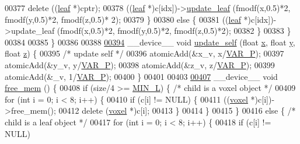 \begin{DoxyCode}
{00377                     \textcolor{keyword}{delete} ((\hyperlink{classleaf}{leaf} *)cptr);
00378                 ((\hyperlink{classleaf}{leaf} *)c[idx])->\hyperlink{classleaf_a3c205ce57e242832977bde6e1a04d7da}{update\_leaf} (fmodf(x,0.5)*2, fmodf(y,0.5)*2, fmodf(z,0.5)*
      2);
00379             \}
00380             \textcolor{keywordflow}{else} \{
00381                 ((\hyperlink{classleaf}{leaf} *)c[idx])->update\_leaf (fmodf(x,0.5)*2, fmodf(y,0.5)*2, fmodf(z,0.5)*2);
00382             \}
00383         \}
00384 
00385     \}
00386 
00388 
\hypertarget{Voxel_8cuh_source.tex_l00394}{}\hyperlink{classvoxel_a1748472909af5ef1f28d0a0c6648dbbd}{00394}     \_\_device\_\_ \textcolor{keywordtype}{void} \hyperlink{classvoxel_a1748472909af5ef1f28d0a0c6648dbbd}{update\_self} (\textcolor{keywordtype}{float} \hyperlink{classquaternion_acdcda48f9dd7ff35873aae38fa33ab78}{x}, \textcolor{keywordtype}{float} \hyperlink{classquaternion_a48e3d1fbf5e12eb54985c32b45dd8303}{y}, \textcolor{keywordtype}{float} \hyperlink{classquaternion_a538598007238d399f79ddcecd39ef5cf}{z}) \{
00395         \textcolor{comment}{/* update self */}
00396         atomicAdd(&x\_v, x/\hyperlink{Voxel_8cuh_ae1cd6283839fc3aebf9bccbd1044a365}{VAR\_P});
00397         atomicAdd(&y\_v, y/\hyperlink{Voxel_8cuh_ae1cd6283839fc3aebf9bccbd1044a365}{VAR\_P});
00398         atomicAdd(&z\_v, z/\hyperlink{Voxel_8cuh_ae1cd6283839fc3aebf9bccbd1044a365}{VAR\_P});
00399         atomicAdd(&\_v, 1/\hyperlink{Voxel_8cuh_ae1cd6283839fc3aebf9bccbd1044a365}{VAR\_P});
00400     \}
00401 
00403 
\hypertarget{Voxel_8cuh_source.tex_l00407}{}\hyperlink{classvoxel_aff25abf72186eb31821d1ffacf557c67}{00407}     \_\_device\_\_ \textcolor{keywordtype}{void} \hyperlink{classvoxel_aff25abf72186eb31821d1ffacf557c67}{free\_mem} () \{
00408         \textcolor{keywordflow}{if} (size/4 >= \hyperlink{Voxel_8cuh_a29d8f4bb35f9fa62e1d680bc6ab1f4f1}{MIN\_L}) \{ \textcolor{comment}{/* child is a voxel object */}
00409             \textcolor{keywordflow}{for} (\textcolor{keywordtype}{int} i = 0; i < 8; i++) \{
00410                 \textcolor{keywordflow}{if} (c[i] != NULL) \{
00411                     ((\hyperlink{classvoxel}{voxel} *)c[i])->free\_mem();
00412                     \textcolor{keyword}{delete} (\hyperlink{classvoxel}{voxel} *)c[i];
00413                 \}
00414             \}
00415         \}
00416         \textcolor{keywordflow}{else} \{ \textcolor{comment}{/* child is a leaf object */}
00417             \textcolor{keywordflow}{for} (\textcolor{keywordtype}{int} i = 0; i < 8; i++) \{
00418                 \textcolor{keywordflow}{if} (c[i] != NULL)
}
\end{DoxyCode}
